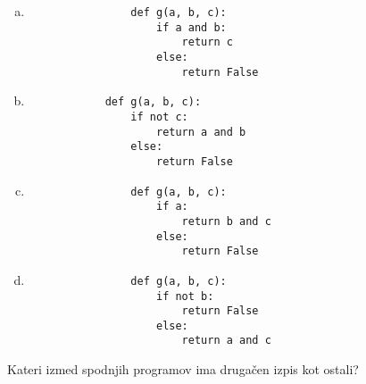 \documentclass[arhiv, 10pt]{../izpit}
\begin{document}
        \begin{multicols}{2}
        \begin{enumerate}[(a)]
\item 
                \begin{verbatim}
                def g(a, b, c):
                    if a and b:
                        return c
                    else:
                        return False
                \end{verbatim}
            
\item 
            \begin{verbatim}
            def g(a, b, c):
                if not c:
                    return a and b
                else:
                    return False
            \end{verbatim}
        
\item 
                \begin{verbatim}
                def g(a, b, c):
                    if a:
                        return b and c
                    else:
                        return False
                \end{verbatim}
            
\item 
                \begin{verbatim}
                def g(a, b, c):
                    if not b:
                        return False
                    else:
                        return a and c
                \end{verbatim}
            
\end{enumerate}

        \end{multicols}
    
        \naloga*
        
        Kateri izmed spodnjih programov ima drugačen izpis kot ostali?
    
\end{document}
